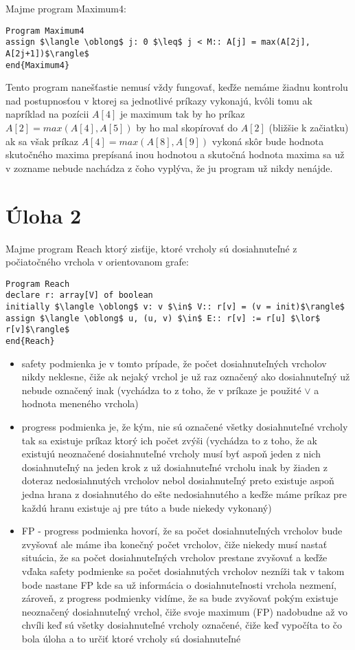 \documentclass[a4paper]{article}
\begin{document}
Majme program Maximum4:
\begin{lstlisting}
Program Maximum4
assign $\langle \oblong$ j: 0 $\leq$ j < M:: A[j] = max(A[2j], A[2j+1])$\rangle$
end{Maximum4}
\end{lstlisting}

Tento program nanešťastie nemusí vždy fungovať, keďže nemáme žiadnu kontrolu nad postupnosťou v ktorej sa jednotlivé príkazy vykonajú, kvôli tomu ak napríklad na pozícii $A[4]$ je maximum tak by ho príkaz $A[2] = max(A[4], A[5])$ by ho mal skopírovať do $A[2]$ (bližšie k začiatku) ak sa však príkaz $A[4] = max(A[8], A[9])$ vykoná skôr bude hodnota skutočného maxima prepísaná inou hodnotou a skutočná hodnota maxima sa už v zozname nebude nachádza z čoho vyplýva, že ju program už nikdy nenájde. 

\section{Úloha 2}

Majme program Reach ktorý zisťije, ktoré vrcholy sú dosiahnuteľné z počiatočného vrchola v orientovanom grafe:
\begin{lstlisting}
Program Reach
declare r: array[V] of boolean
initially $\langle \oblong$ v: v $\in$ V:: r[v] = (v = init)$\rangle$
assign $\langle \oblong$ u, (u, v) $\in$ E:: r[v] := r[u] $\lor$ r[v]$\rangle$
end{Reach}
\end{lstlisting}

\begin{itemize}
	\item safety podmienka je v tomto prípade, že počet dosiahnuteľných vrcholov nikdy neklesne, čiže ak nejaký vrchol je už raz označený ako dosiahnuteľný už nebude označený inak (vychádza to z toho, že v príkaze je použité $\lor$ a hodnota meneného vrchola)
	\item progress podmienka je, že kým, nie sú označené všetky dosiahnuteľné vrcholy tak sa existuje príkaz ktorý ich počet zvýši (vychádza to z toho, že ak existujú neoznačené dosiahnuteľné vrcholy musí byť aspoň jeden z nich dosiahnuteľný na jeden krok z už dosiahnuteľné vrcholu inak by žiaden z doteraz nedosiahnutých vrcholov nebol dosiahnuteľný preto existuje aspoň jedna hrana z dosiahnutého do ešte nedosiahnutého a keďže máme príkaz pre každú hranu existuje aj pre túto a bude niekedy vykonaný)
	\item FP - progress podmienka hovorí, že sa počet dosiahnuteľných vrcholov bude zvyšovať ale máme iba konečný počet vrcholov, čiže niekedy musí nastať situácia, že sa počet dosiahnuteľných vrcholov prestane zvyšovať a keďže vďaka safety podmienke sa počet dosiahnutých vrcholov nezníži tak v takom bode nastane FP kde sa už informácia o dosiahnuteľnosti vrchola nezmení, zároveň, z progress podmienky vidíme, že sa bude zvyšovať pokým existuje neoznačený dosiahnuteľný vrchol, čiže svoje maximum (FP) nadobudne až vo chvíli keď sú všetky dosiahnuteľné vrcholy označené, čiže keď vypočíta to čo bola úloha a to určiť ktoré vrcholy sú dosiahnuteľné  
\end{itemize}
\end{document}
